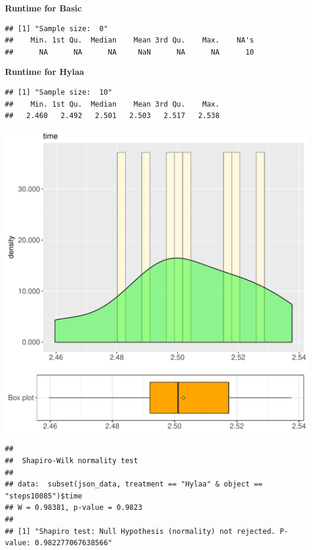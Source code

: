 \documentclass{article}\usepackage[]{graphicx}\usepackage[]{color}
\makeatletter
\def\maxwidth{ %
  \ifdim\Gin@nat@width>\linewidth
    \linewidth
  \else
    \Gin@nat@width
  \fi
}
\newenvironment{kframe}{%
 \def\at@end@of@kframe{}%
 \ifinner\ifhmode%
  \def\at@end@of@kframe{\end{minipage}}%
  \begin{minipage}{\columnwidth}%
 \fi\fi%
 \def\FrameCommand##1{\hskip\@totalleftmargin \hskip-\fboxsep
 \colorbox{shadecolor}{##1}\hskip-\fboxsep
     \hskip-\linewidth \hskip-\@totalleftmargin \hskip\columnwidth}%
 \MakeFramed {\advance\hsize-\width
   \@totalleftmargin\z@ \linewidth\hsize
   \@setminipage}}%
 {\par\unskip\endMakeFramed%
 \at@end@of@kframe}
\newenvironment{knitrout}{}{} %
\makeatother
\begin{document}
 \textbf{Runtime for Basic}
\begin{knitrout}
\color{fgcolor}\begin{kframe}
\begin{verbatim}
## [1] "Sample size:  0"
##    Min. 1st Qu.  Median    Mean 3rd Qu.    Max.    NA's 
##      NA      NA      NA     NaN      NA      NA      10
\end{verbatim}
\end{kframe}
\end{knitrout}
 \textbf{Runtime for Hylaa}
\begin{knitrout}
\color{fgcolor}\begin{kframe}
\begin{verbatim}
## [1] "Sample size:  10"
##    Min. 1st Qu.  Median    Mean 3rd Qu.    Max. 
##   2.460   2.492   2.501   2.503   2.517   2.538
\end{verbatim}
\end{kframe}
\includegraphics[width=\maxwidth]{figure/RH3_Hylaa_steps10085-1} 
\begin{kframe}\begin{verbatim}
## 
## 	Shapiro-Wilk normality test
## 
## data:  subset(json_data, treatment == "Hylaa" & object == "steps10085")$time
## W = 0.98381, p-value = 0.9823
## 
## [1] "Shapiro test: Null Hypothesis (normality) not rejected. P-value: 0.982277067638566"
\end{verbatim}
\end{kframe}
\end{knitrout}
  
\end{document}
